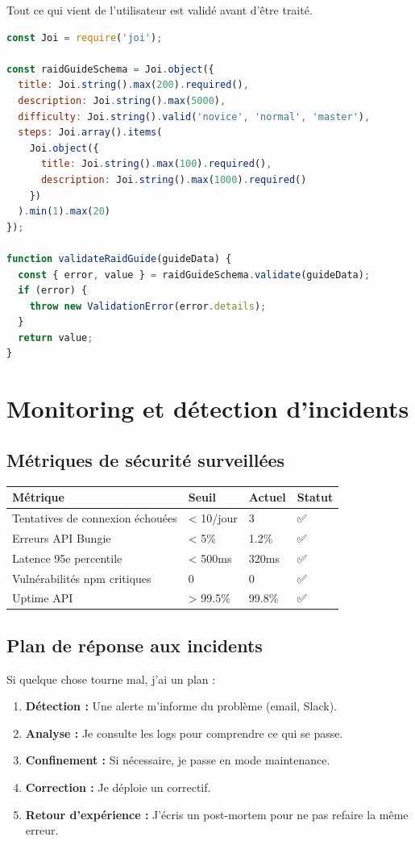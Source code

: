 Tout ce qui vient de l'utilisateur est validé avant d'être traité.

\begin{lstlisting}[language=JavaScript]
const Joi = require('joi');

const raidGuideSchema = Joi.object({
  title: Joi.string().max(200).required(),
  description: Joi.string().max(5000),
  difficulty: Joi.string().valid('novice', 'normal', 'master'),
  steps: Joi.array().items(
    Joi.object({
      title: Joi.string().max(100).required(),
      description: Joi.string().max(1000).required()
    })
  ).min(1).max(20)
});

function validateRaidGuide(guideData) {
  const { error, value } = raidGuideSchema.validate(guideData);
  if (error) {
    throw new ValidationError(error.details);
  }
  return value;
}
\end{lstlisting}

\section{Monitoring et détection d'incidents}

\subsection{Métriques de sécurité surveillées}

\begin{center}
\begin{tabular}{|l|l|l|l|}
\hline
\textbf{Métrique} & \textbf{Seuil} & \textbf{Actuel} & \textbf{Statut} \\
\hline
Tentatives de connexion échouées & < 10/jour & 3 & ✅ \\
Erreurs API Bungie & < 5\% & 1.2\% & ✅ \\
Latence 95e percentile & < 500ms & 320ms & ✅ \\
Vulnérabilités npm critiques & 0 & 0 & ✅ \\
Uptime API & > 99.5\% & 99.8\% & ✅ \\
\hline
\end{tabular}
\end{center}

\subsection{Plan de réponse aux incidents}

Si quelque chose tourne mal, j'ai un plan :

\begin{enumerate}
    \item \textbf{Détection :} Une alerte m'informe du problème (email, Slack).
    \item \textbf{Analyse :} Je consulte les logs pour comprendre ce qui se passe.
    \item \textbf{Confinement :} Si nécessaire, je passe en mode maintenance.
    \item \textbf{Correction :} Je déploie un correctif.
    \item \textbf{Retour d'expérience :} J'écris un post-mortem pour ne pas refaire la même erreur.
\end{enumerate}

